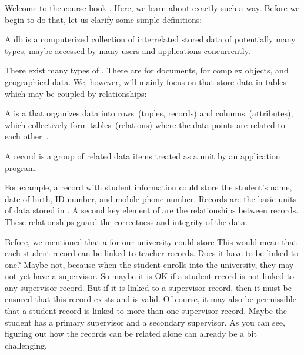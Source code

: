 Welcome to the course book .
Here, we learn about exactly such a way.
Before we begin to do that, let us clarify some simple definitions:%
%
\begin{definition}[Database]%
A \acrfull{db} is a computerized collection of interrelated stored data of potentially many types, maybe accessed by many users and applications concurrently.%
\end{definition}%
%
There exist many types of .
There are  for documents,  for complex objects, and  geographical data.
We, however, will mainly focus on  that store data in tables which may be coupled by relationships:%
%
\begin{definition}%
A  is a  that organizes data into rows~(tuples, records) and columns~(attributes), which collectively form tables~(relations) where the data points are related to each other~\cite{I2021WIARDB,C1970ARMODFLSDB,SC1975OTPOARADI,T2018ISARD,H2016RDDAI,HM2024IMARD}.
\end{definition}%
%
\begin{definition}[Record]%
A record is a group of related data items treated as a unit by an application program.%
\end{definition}%
%
For example, a record with student information could store the student's name, date of birth, ID number, and mobile phone number.
Records are the basic units of data stored in .
A second key element of  are the relationships between records.
These relationships guard the correctness and integrity of the data.

Before, we mentioned that a  for our university could store 
This would mean that each student record can be linked to teacher records.
Does it have to be linked to one?
Maybe not, because when the student enrolls into the university, they may not yet have a supervisor.
So maybe it is OK if a student record is not linked to any supervisor record.
But if it is linked to a supervisor record, then it must be ensured that this record exists and is valid.
Of course, it may also be permissible that a student record is linked to more than one supervisor record.
Maybe the student has a primary supervisor and a secondary supervisor.
As you can see, figuring out how the records can be related alone can already be a bit challenging.%

